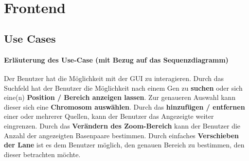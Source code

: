 \section{Frontend}
\subsection{Use Cases}
\paragraph{Erläuterung des Use-Case (mit Bezug auf das Sequenzdiagramm)}
Der Benutzer hat die Möglichkeit mit der GUI zu interagieren. Durch das Suchfeld hat der Benutzer die Möglichkeit nach einem Gen zu \textbf{suchen} oder sich eine(n) \textbf{Position / Bereich anzeigen lassen}. Zur genaueren Auswahl kann dieser sich eine \textbf{Chromosom auswählen}. Durch das \textbf{hinzufügen / entfernen} einer oder mehrerer Quellen, kann der Benutzer das Angezeigte weiter eingrenzen. Durch das \textbf{Verändern des Zoom-Bereich} kann der Benutzer die Anzahl der angezeigten Basenpaare bestimmen. Durch einfaches \textbf{Verschieben der Lane} ist es dem Benutzer möglich, den genauen Bereich zu bestimmen, den dieser betrachten möchte.

